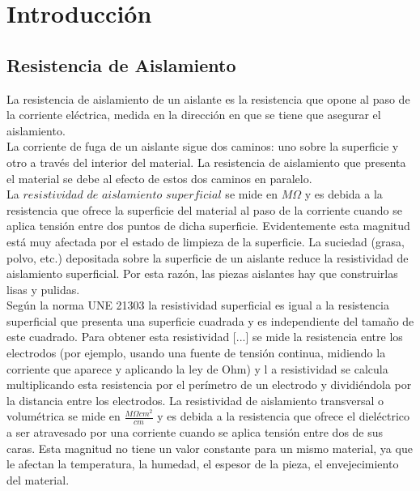 \documentclass[]{article}
\begin{document}
	
	 
	

	
	
		
	\section{Introducción}
	
	
	\subsection{Resistencia de Aislamiento}
	
	La resistencia de aislamiento
	de un aislante es la resistencia que opone al paso de 
	la   corriente   eléctrica,   medida   en   la   dirección   en   que   se   tiene   que   asegurar   
	el aislamiento.\\
	
	La corriente de fuga de un aislante sigue dos caminos: uno sobre la superficie y 
	otro  a  través  del  interior  del  material.  La  resistencia  de  aislamiento  que  presenta  el  
	material se debe al efecto de estos dos caminos en paralelo.\\
	
	La 
	$resistividad$ $de$ $aislamiento$ $superficial$
	se mide
	en $M \Omega$
	y es debida a la resistencia 
	que  ofrece  la  superficie  del  material  al  paso  de  la  corriente  cuando  se  aplica  tensión  
	entre dos puntos de dicha superficie. Evidentemente esta magnitud está muy 
	afectada  por  el  estado  de  limpieza  de  la  superficie.  La  suciedad  (grasa,  polvo,  etc.)  
	depositada  sobre  la  superficie  de  un  aislante 
	reduce  la  resistividad  de  aislamiento  
	superficial. Por esta razón, las piezas aislantes hay que construirlas lisas y pulidas.\\
	
	Según  la  norma  UNE
	21303  la  resistividad  superficial  es  igual  a  la  resistencia  
	superficial 
	que presenta una superficie cuadrada y es independiente del tamaño de este 
	cuadrado. Para 
	obtener
	esta resistividad [...] se mide 
	la resistencia entre los electrodos 
	(por ejemplo, 
	usando  una  fuente  de  tensión  continua, 
	midiendo la corriente que aparece y aplicando la ley de Ohm) y l
	a resistividad 
	se calcula 
	multiplicando  esta
	resistencia
	por  el  perímetro  de  un  electrodo  y  dividiéndola 
	por  la  
	distancia
	entre 
	los 
	electrodos.
	La 
	resistividad de aislamiento transversal o volumétrica
	se mide en $\frac{M \Omega cm^2}{cm}$ y 
	es debida a la resistencia que ofrece el dieléctrico a ser atravesado por una corriente 
	cuando  se  aplica  tensión  entre  dos  de  sus  caras.  Esta  magnitud  no  tiene  un  
	valor constante para un mismo material, ya que le afectan la temperatura, la humedad, 
	el espesor de la pieza, el envejecimiento del material.\\
	
\end{document}
